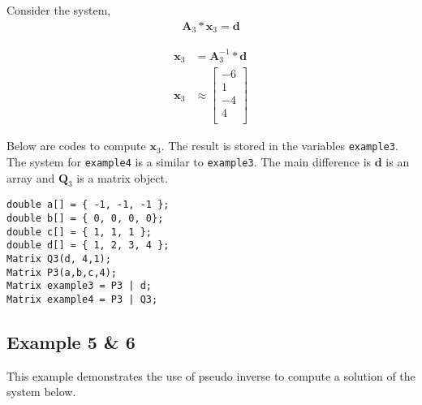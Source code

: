 \documentclass[a4paper]{article}
\begin{document}
\vspace{0.5cm}

Consider the system,
\begin{equation*}
\begin{aligned}
\boldsymbol{A}_{3} * \boldsymbol{x}_{3}  = \boldsymbol{d} 
\end{aligned}
\end{equation*}





\begin{equation*}
\begin{aligned}
\boldsymbol{x}_{3}  &=  \boldsymbol{A}_{3}  ^{-1} * \boldsymbol{d}  \\
\boldsymbol{x}_{3}  &\approx 
\begin{bmatrix} 
-6 \\
1 \\
-4 \\
4\\
\end{bmatrix}
\end{aligned}
\end{equation*}



Below are codes to compute $\boldsymbol{x}_{3}$. The result is stored in the variables \texttt{example3}. The system for \texttt{example4} is a similar to  \texttt{example3}. The main difference is $\boldsymbol{d}$ is an array and $\boldsymbol{Q}_{3}$ is a matrix object.
 

\begin{verbatim}  
double a[] = { -1, -1, -1 };
double b[] = { 0, 0, 0, 0};
double c[] = { 1, 1, 1 };
double d[] = { 1, 2, 3, 4 };
Matrix Q3(d, 4,1); 
Matrix P3(a,b,c,4); 
Matrix example3 = P3 | d;
Matrix example4 = P3 | Q3;
\end{verbatim}








\subsection{Example 5 \& 6}

This example demonstrates the use of pseudo inverse to compute a solution of the system below.
\end{document}
